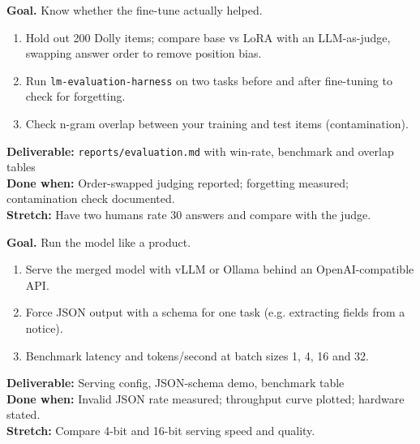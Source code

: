 \begin{tcolorbox}[enhanced,breakable,colback=white,colframe=sun,boxrule=0.8pt,arc=2pt,left=7pt,right=7pt,top=4pt,bottom=4pt,
  title={\bfseries Thursday --- A rigorous evaluation harness\hfill\normalfont\small 3 h},coltitle=white,colbacktitle=sun,fonttitle=\small]
\textbf{Goal.} Know whether the fine-tune actually helped.
\begin{enumerate}[itemsep=1pt,topsep=2pt]
  \item Hold out 200 Dolly items; compare base vs LoRA with an LLM-as-judge, swapping answer order to remove position bias.
  \item Run \texttt{lm-evaluation-harness} on two tasks before and after fine-tuning to check for forgetting.
  \item Check n-gram overlap between your training and test items (contamination).
\end{enumerate}
\textbf{\color{dataC}Deliverable:} \texttt{reports/evaluation.md} with win-rate, benchmark and overlap tables\\
\textbf{\color{navy}Done when:} Order-swapped judging reported; forgetting measured; contamination check documented.\\
\textbf{\color{skillC}Stretch:} Have two humans rate 30 answers and compare with the judge.
\end{tcolorbox}

\begin{tcolorbox}[enhanced,breakable,colback=white,colframe=sun,boxrule=0.8pt,arc=2pt,left=7pt,right=7pt,top=4pt,bottom=4pt,
  title={\bfseries Friday --- Serving, structured output and throughput\hfill\normalfont\small 2--3 h},coltitle=white,colbacktitle=sun,fonttitle=\small]
\textbf{Goal.} Run the model like a product.
\begin{enumerate}[itemsep=1pt,topsep=2pt]
  \item Serve the merged model with vLLM or Ollama behind an OpenAI-compatible API.
  \item Force JSON output with a schema for one task (e.g. extracting fields from a notice).
  \item Benchmark latency and tokens/second at batch sizes 1, 4, 16 and 32.
\end{enumerate}
\textbf{\color{dataC}Deliverable:} Serving config, JSON-schema demo, benchmark table\\
\textbf{\color{navy}Done when:} Invalid JSON rate measured; throughput curve plotted; hardware stated.\\
\textbf{\color{skillC}Stretch:} Compare 4-bit and 16-bit serving speed and quality.
\end{tcolorbox}


